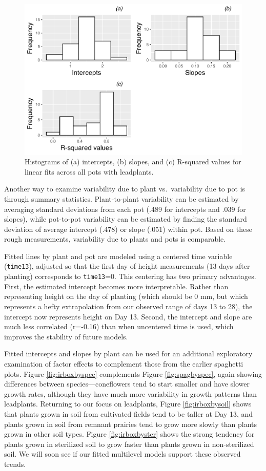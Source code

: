 \documentclass[
]{krantz}
\begin{document}
\begin{figure}

{\centering \includegraphics[width=0.6\linewidth]{bookdown-BeyondMLR_files/figure-latex/intratepot-1} 

}

\caption{Histograms of (a) intercepts, (b) slopes, and (c) R-squared values for linear fits across all pots with leadplants.}\label{fig:intratepot}
\end{figure}

Another way to examine variability due to plant vs.~variability due to pot is through summary statistics. Plant-to-plant variability can be estimated by averaging standard deviations from each pot (.489 for intercepts and .039 for slopes), while pot-to-pot variability can be estimated by finding the standard deviation of average intercept (.478) or slope (.051) within pot. Based on these rough measurements, variability due to plants and pots is comparable.

Fitted lines by plant and pot are modeled using a centered time variable (\texttt{time13}), adjusted so that the first day of height measurements (13 days after planting) corresponds to \texttt{time13}=0. This centering has two primary advantages. First, the estimated intercept becomes more interpretable. Rather than representing height on the day of planting (which should be 0 mm, but which represents a hefty extrapolation from our observed range of days 13 to 28), the intercept now represents height on Day 13. Second, the intercept and slope are much less correlated (r=-0.16) than when uncentered time is used, which improves the stability of future models.

Fitted intercepts and slopes by plant can be used for an additional exploratory examination of factor effects to complement those from the earlier spaghetti plots. Figure \ref{fig:irboxbyspec} complements Figure \ref{fig:spagbyspec}, again showing differences between species---coneflowers tend to start smaller and have slower growth rates, although they have much more variability in growth patterns than leadplants. Returning to our focus on leadplants, Figure \ref{fig:irboxbysoil} shows that plants grown in soil from cultivated fields tend to be taller at Day 13, and plants grown in soil from remnant prairies tend to grow more slowly than plants grown in other soil types. Figure \ref{fig:irboxbyster} shows the strong tendency for plants grown in sterilized soil to grow faster than plants grown in non-sterilized soil. We will soon see if our fitted multilevel models support these observed trends.
\end{document}
